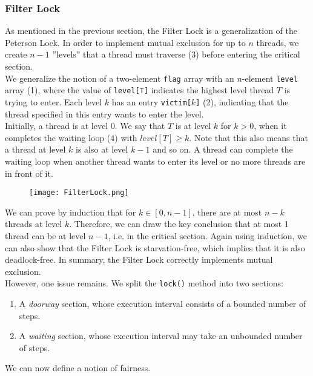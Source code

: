 \documentclass[main]{subfiles}
\begin{document}

\subsubsection{Filter Lock} \label{Filter Lock}
As mentioned in the previous section, the Filter Lock is a generalization of the Peterson Lock. In order to implement mutual exclusion for up to $n$ threads, we create $n-1$ ''levels'' that a thread must traverse (3) before entering the critical section. \\[3mm]
We generalize the notion of a two-element \texttt{flag} array with an $n$-element \texttt{level} array (1), where the value of \texttt{level[T]} indicates the highest level thread $T$ is trying to enter. Each level $k$ has an entry \texttt{victim[$k$]} (2), indicating that the thread specified in this entry wants to enter the level.\\[3mm]
Initially, a thread is at level 0. We say that $T$ is at level $k$ for $k>0$, when it completes the waiting loop (4) with $level[T]\geq k$. Note that this also means that a thread at level $k$ is also at level $k-1$ and so on. A thread can complete the waiting loop when another thread wants to enter its level or no more threads are in front of it.\\[3mm]
\begin{figure}[H]
    \centering
    \texttt{[image: FilterLock.png]}
\end{figure}
\noindent We can prove by induction that for $k \in [0,n-1]$, there are at most $n-k$ threads at level $k$. Therefore, we can draw the key conclusion that at most 1 thread can be at level $n-1$, i.e. in the critical section. Again using induction, we can also show that the Filter Lock is starvation-free, which implies that it is also deadlock-free. In summary, the Filter Lock correctly implements mutual exclusion.\\[3mm]
However, one issue remains. We split the \texttt{lock()} method into two sections:
\begin{enumerate}
    \item A \textit{doorway} section, whose execution interval consists of a bounded number of steps.
    \item A \textit{waiting} section, whose execution interval may take an unbounded number of steps.
\end{enumerate}
We can now define a notion of fairness.
\end{document}
